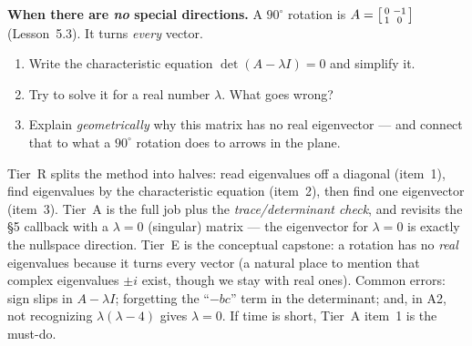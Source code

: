 \documentclass[10pt]{article}
\begin{document}
\begin{tcolorbox}[colback=white, colframe=black!40, title=\textbf{Tier E --- Extension},
    fonttitle=\bfseries, arc=1.5mm, left=3mm, right=3mm, top=2mm, bottom=2mm, breakable]
\textbf{When there are \emph{no} special directions.} A $90^\circ$ rotation is
$A=\begin{bsmallmatrix} 0 & -1\\ 1 & 0 \end{bsmallmatrix}$ (Lesson~5.3). It turns \emph{every} vector.
\begin{enumerate}[leftmargin=1.7em, itemsep=9pt]
  \item Write the characteristic equation $\det(A-\lambda I)=0$ and simplify it.
  \item Try to solve it for a real number $\lambda$. What goes wrong?
  \item Explain \emph{geometrically} why this matrix has no real eigenvector --- and connect that to
        what a $90^\circ$ rotation does to arrows in the plane.
\end{enumerate}
\end{tcolorbox}

\begin{teachernote}
Tier~R splits the method into halves: read eigenvalues off a diagonal (item~1), find eigenvalues by the
characteristic equation (item~2), then find one eigenvector (item~3). Tier~A is the full job plus the
\emph{trace/determinant check}, and revisits the §5 callback with a $\lambda=0$ (singular) matrix
--- the eigenvector for $\lambda=0$ is exactly the nullspace direction. Tier~E is the conceptual
capstone: a rotation has no \emph{real} eigenvalues because it turns every vector (a natural place to
mention that complex eigenvalues $\pm i$ exist, though we stay with real ones). Common errors: sign
slips in $A-\lambda I$; forgetting the ``$-bc$'' term in the determinant; and, in A2, not recognizing
$\lambda(\lambda-4)$ gives $\lambda=0$. If time is short, Tier~A item~1 is the must-do.
\end{teachernote}
\end{document}
